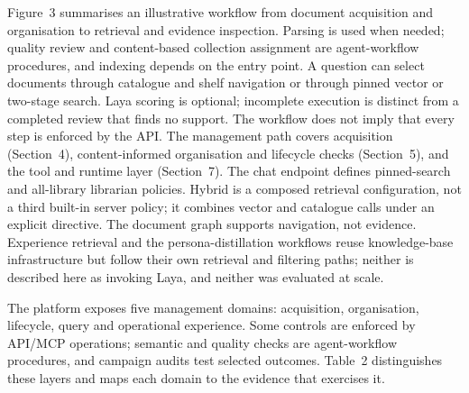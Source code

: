\documentclass[11pt]{article}
\begin{document}
Figure~3 summarises an illustrative workflow from document
acquisition and organisation to retrieval and evidence inspection. Parsing is
used when needed; quality review and content-based collection assignment are
agent-workflow procedures, and indexing depends on the entry point. A question
can select documents through catalogue and shelf navigation or through pinned
vector or two-stage search. Laya scoring is optional; incomplete execution is
distinct from a completed review that finds no support. The workflow does not
imply that every step is enforced by the API. The management path covers
acquisition (Section~4), content-informed organisation
and lifecycle checks (Section~5), and the tool and
runtime layer (Section~7). The chat endpoint defines
pinned-search and all-library librarian policies. Hybrid is a composed retrieval
configuration, not a third built-in server policy; it combines vector and
catalogue calls under an explicit directive. The document graph supports
navigation, not evidence. Experience retrieval and the persona-distillation
workflows reuse knowledge-base infrastructure but follow their own retrieval
and filtering paths; neither is described here as invoking Laya, and neither
was evaluated at scale.

The platform exposes five management domains: acquisition, organisation,
lifecycle, query and operational experience. Some controls are enforced by
API/MCP operations; semantic and quality checks are agent-workflow procedures,
and campaign audits test selected outcomes. Table~2
distinguishes these layers and maps each domain to the evidence that exercises
it.
\end{document}

